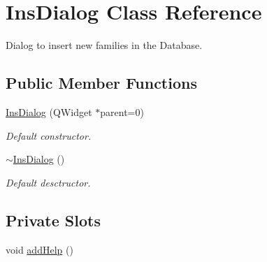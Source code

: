 \hypertarget{class_ins_dialog}{\section{Ins\+Dialog Class Reference}
\label{class_ins_dialog}
}


Dialog to insert new families in the Database.  


\subsection*{Public Member Functions}
\begin{DoxyCompactItemize}
\item 
\hyperlink{class_ins_dialog_a4a3cd89b0f67e2ef788333272106125a}{Ins\+Dialog} (Q\+Widget $\ast$parent=0)
\begin{DoxyCompactList}\small\item\em Default constructor. \end{DoxyCompactList}\item 
\hyperlink{class_ins_dialog_a9c15fe45d3d2c9eaa484df2213b791e2}{$\sim$\+Ins\+Dialog} ()
\begin{DoxyCompactList}\small\item\em Default desctructor. \end{DoxyCompactList}\end{DoxyCompactItemize}
\subsection*{Private Slots}
\begin{DoxyCompactItemize}
\item 
void \hyperlink{class_ins_dialog_a44a1f7a74f99cfff6cb76babfb7ffbe0}{add\+Help} ()
\end{DoxyCompactItemize}
